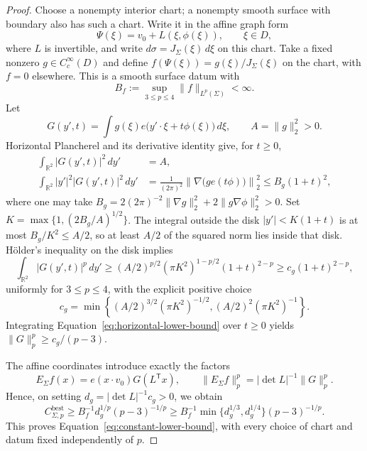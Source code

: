 \begin{proof}
Choose a nonempty interior chart; a nonempty smooth surface with
boundary also has such a chart.  Write it in the affine graph form
\[
 \Psi(\xi)=v_0+L(\xi,\phi(\xi)),\qquad \xi\in D,
\]
where $L$ is invertible, and write $d\sigma=J_\Sigma(\xi)\,d\xi$
on this chart.  Take a fixed nonzero $g\in C_c^\infty(D)$ and
define $f(\Psi(\xi))=g(\xi)/J_\Sigma(\xi)$ on the chart, with
$f=0$ elsewhere.  This is a smooth surface datum with
\[
 B_f:=\sup_{3\leq p\leq4}\|f\|_{L^p(\Sigma)}<\infty.
\]
Let
\[
 G(y',t)=\int g(\xi)e\big(y'\cdot\xi+t\phi(\xi)\big)\,d\xi,
 \qquad A=\|g\|_2^2>0.
\]
Horizontal Plancherel and its derivative identity give, for $t\geq0$,
\begin{align*}
 \int_{\mathbb R^2}|G(y',t)|^2\,dy'&=A,\\
 \int_{\mathbb R^2}|y'|^2|G(y',t)|^2\,dy'
 &=\frac1{(2\pi)^2}
       \left\|\nabla\big(g e(t\phi)\big)\right\|_2^2
 \leq B_g(1+t)^2,
\end{align*}
where one may take
$B_g=2(2\pi)^{-2}\|\nabla g\|_2^2+2\|g\nabla\phi\|_2^2>0$.
Set $K=\max\{1,(2B_g/A)^{1/2}\}$.
The integral outside the disk $|y'|<K(1+t)$ is at most
$B_g/K^2\leq A/2$, so at least $A/2$ of the squared norm lies
inside that disk.  H\"older's inequality on the disk implies
\begin{equation}\label{eq:horizontal-lower-bound}
 \int_{\mathbb R^2}|G(y',t)|^p\,dy'
 \geq (A/2)^{p/2}(\pi K^2)^{1-p/2}(1+t)^{2-p}
 \geq c_g(1+t)^{2-p},
\end{equation}
uniformly for $3\leq p\leq4$, with the explicit positive choice
\[
 c_g=\min\left\{
 (A/2)^{3/2}(\pi K^2)^{-1/2},
 (A/2)^2(\pi K^2)^{-1}
 \right\}.
\]
Integrating Equation~\eqref{eq:horizontal-lower-bound} over
$t\geq0$ yields $\|G\|_p^p\geq c_g/(p-3)$.

The affine coordinates introduce exactly the factors
\[
 E_\Sigma f(x)=e(x\cdot v_0)G(L^{\mathsf T}x),\qquad
 \|E_\Sigma f\|_p^p=|\det L|^{-1}\|G\|_p^p.
\]
Hence, on setting $d_g=|\det L|^{-1}c_g>0$, we obtain
\[
 C_{\Sigma,p}^{\mathrm{best}}
 \geq B_f^{-1}d_g^{1/p}(p-3)^{-1/p}
 \geq B_f^{-1}\min\{d_g^{1/3},d_g^{1/4}\}(p-3)^{-1/p}.
\]
This proves Equation~\eqref{eq:constant-lower-bound}, with every
choice of chart and datum fixed independently of $p$.
\end{proof}
